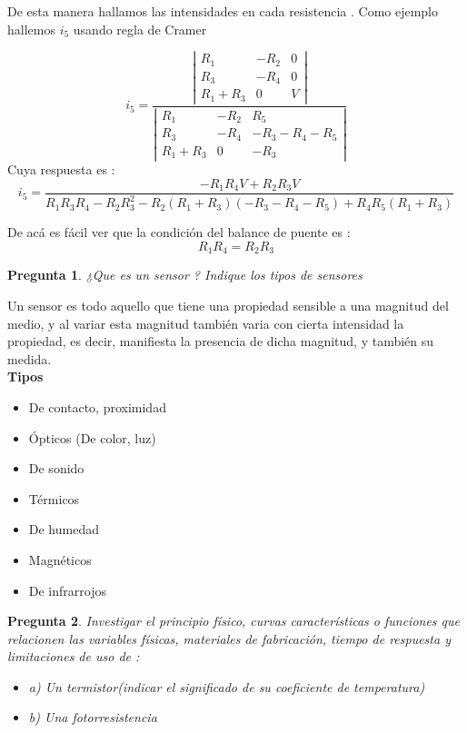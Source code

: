\documentclass[a4paper,12pt]{article}
\newtheorem{preg}{Pregunta} %
\begin{document}
De esta manera hallamos las intensidades en cada resistencia . Como ejemplo hallemos $i_5$ usando regla de Cramer

$$
i_5 = \dfrac{\left|\begin{matrix}R_{1} & - R_{2} & 0\\R_{3} & - R_{4} & 0\\R_{1} + R_{3} & 0 & V\end{matrix}\right|}{\left|\begin{matrix}R_{1} & - R_{2} & R_{5}\\R_{3} & - R_{4} & - R_{3} - R_{4} - R_{5}\\R_{1} + R_{3} & 0 & - R_{3}\end{matrix}\right|}
$$ 
Cuya respuesta es : 
$$
i_5 = \frac{- R_{1} R_{4} V + R_{2} R_{3} V}{R_{1} R_{3} R_{4} - R_{2} R_{3}^{2} - R_{2} \left(R_{1} + R_{3}\right) \left(- R_{3} - R_{4} - R_{5}\right) + R_{4} R_{5} \left(R_{1} + R_{3}\right)}
$$

De acá es fácil ver que la condición del balance de puente es :
$$
R_{1} R_{4}  = R_{2} R_{3}
$$

\begin{preg}
¿Que es un sensor ? Indique los tipos de sensores
\end{preg}

Un sensor es todo aquello que tiene una propiedad sensible a una magnitud del medio, y al variar esta magnitud también varia con cierta intensidad la propiedad, es decir, manifiesta la presencia de dicha magnitud, y también su medida.\\

\textbf{Tipos}



\begin{itemize}
\item De contacto, proximidad
\item Ópticos (De color, luz)
\item De sonido
\item Térmicos
\item De humedad
\item Magnéticos
\item De infrarrojos
\end{itemize}




\begin{preg}
Investigar el principio físico, curvas características o funciones que relacionen las variables físicas, materiales de fabricación, tiempo de respuesta y limitaciones de uso de :
\begin{itemize}
\item a) Un termistor(indicar el significado de su coeficiente de temperatura)
\item b) Una fotorresistencia
\end{itemize}
\end{preg}
\end{document}
